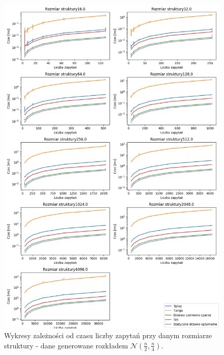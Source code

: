 \documentclass[declaration,shortabstract]{iithesis}
\theoremstyle{thm}
\theoremstyle{remark}
\theoremstyle{plain}
\theoremstyle{plain}
\theoremstyle{plain}
\begin{document}
\begin{figure}[H]  
\centering
    \includegraphics[scale=0.5]{wykresy/gaus025.png}
      \caption{Wykresy zależności od czasu liczby zapytań przy danym rozmiarze struktury - dane generowane rozkładem \(\mathcal{N}(\frac{n}{2}, \frac{n}{4})\). }  
    \label{fig:zigzig} 
\end{figure}
\end{document}
